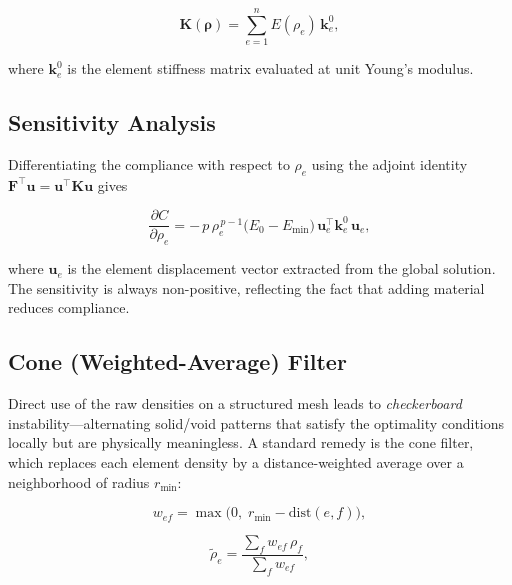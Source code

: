 \documentclass[11pt,a4paper]{article}
\begin{document}
\begin{equation}
  \mathbf{K}(\boldsymbol{\rho}) = \sum_{e=1}^{n} E(\rho_e)\,\mathbf{k}_e^0,
  \label{eq:stiffness}
\end{equation}

\noindent where $\mathbf{k}_e^0$ is the element stiffness matrix evaluated
at unit Young's modulus.

\subsection{Sensitivity Analysis}
\label{sec:sensitivity}

Differentiating the compliance with respect to $\rho_e$ using the adjoint
identity $\mathbf{F}^{\!\top} \mathbf{u} = \mathbf{u}^{\!\top}\mathbf{K}\mathbf{u}$
gives

\begin{equation}
  \frac{\partial C}{\partial \rho_e}
  = -\,p\,\rho_e^{\,p-1}\bigl(E_0 - E_{\min}\bigr)\,
    \mathbf{u}_e^{\!\top}\mathbf{k}_e^0\,\mathbf{u}_e,
  \label{eq:sensitivity}
\end{equation}

\noindent where $\mathbf{u}_e$ is the element displacement vector extracted
from the global solution.  The sensitivity is always non-positive, reflecting
the fact that adding material reduces compliance.

\subsection{Cone (Weighted-Average) Filter}
\label{sec:filter}

Direct use of the raw densities on a structured mesh leads to
\emph{checkerboard} instability---alternating solid/void patterns that
satisfy the optimality conditions locally but are physically meaningless.
A standard remedy is the cone filter, which replaces each element density
by a distance-weighted average over a neighborhood of radius $r_\mathrm{min}$:

\begin{equation}
  w_{ef} = \max\!\bigl(0,\; r_\mathrm{min} - \mathrm{dist}(e, f)\bigr),
  \label{eq:weights}
\end{equation}

\begin{equation}
  \tilde{\rho}_e
  = \frac{\displaystyle\sum_{f} w_{ef}\,\rho_f}
         {\displaystyle\sum_{f} w_{ef}},
  \label{eq:density_filter}
\end{equation}
\end{document}
